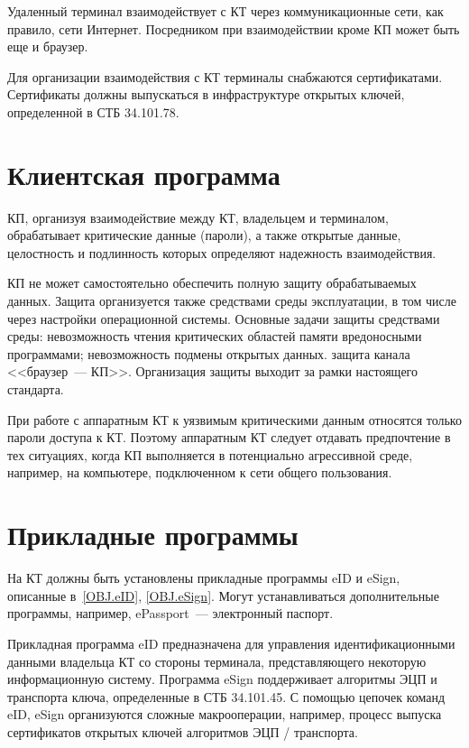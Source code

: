 Удаленный терминал взаимодействует с КТ через коммуникационные сети,
как правило, сети Интернет. Посредником при взаимодействии 
кроме КП может быть еще и браузер. 

Для организации взаимодействия с КТ терминалы снабжаются сертификатами.
Сертификаты должны выпускаться в инфраструктуре открытых ключей, 
определенной в СТБ 34.101.78.

\section{Клиентская программа}

КП, организуя взаимодействие между КТ, владельцем и терминалом,
обрабатывает критические данные (пароли), а также открытые данные, 
целостность и подлинность которых определяют надежность  
взаимодействия.

КП не может самостоятельно 
обеспечить полную защиту обрабатываемых данных. 
Защита организуется также средствами среды эксплуатации, 
в том числе через настройки операционной системы.  
%
Основные задачи защиты средствами среды: 
невозможность чтения критических областей памяти вредоносными программами; 
невозможность подмены открытых данных.
защита канала <<браузер~--- КП>>.
%
Организация защиты выходит за рамки настоящего стандарта.

При работе с аппаратным КТ к уязвимым критическими данным
относятся только пароли доступа к КТ. Поэтому аппаратным КТ следует отдавать 
предпочтение в тех ситуациях, когда КП выполняется в потенциально агрессивной 
среде, например, на компьютере, подключенном к сети общего пользования.


\section{Прикладные программы} 

На КТ должны быть установлены прикладные программы eID и eSign,
описанные в~\ref{OBJ.eID}, \ref{OBJ.eSign}. Могут устанавливаться 
дополнительные программы, например, ePassport~--- электронный 
паспорт.

Прикладная программа eID предназначена для управления идентификационными
данными владельца КТ со стороны терминала, представляющего некоторую 
информационную систему. 
%
Программа eSign поддерживает алгоритмы ЭЦП и транспорта ключа,
определенные в СТБ 34.101.45. С помощью цепочек команд eID, eSign
организуются сложные макрооперации, например, 
процесс выпуска сертификатов открытых ключей алгоритмов ЭЦП / транспорта.

